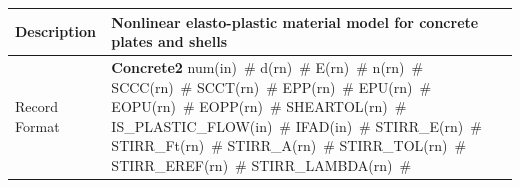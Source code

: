 \documentclass[a4paper]{article}
\newcommand{\descitem}[1]{{\noindent \bf #1}}
\newcommand{\elemparam}[2]{{{#1\tiny (#2)}~\#}}
\newenvironment{mmt}{\begin{tabular}{|l|p{9cm}|}}{\end{tabular}\\}
\newenvironment{mmt}{\begin{tabular}{|l|l|}}{\end{tabular}\\}
\begin{document}
\begin{table}[!htb]
\begin{mmt}
\hline
Description & Nonlinear elasto-plastic material model for concrete
plates and shells\\
\hline
Record Format & \descitem{Concrete2} \elemparam{num}{in}
\elemparam{d}{rn} \elemparam{E}{rn} \elemparam{n}{rn}
\elemparam{SCCC}{rn} \elemparam{SCCT}{rn} \elemparam{EPP}{rn} \elemparam{EPU}{rn}
\elemparam{EOPU}{rn} \elemparam{EOPP}{rn} \elemparam{SHEARTOL}{rn}
\elemparam{IS\_PLASTIC\_FLOW}{in} \elemparam{IFAD}{in} \elemparam{STIRR\_E}{rn} \elemparam{STIRR\_Ft}{rn}
\elemparam{STIRR\_A}{rn} \elemparam{STIRR\_TOL}{rn} \elemparam{STIRR\_EREF}{rn}
\elemparam{STIRR\_LAMBDA}{rn}\\


\end{mmt}
\end{table}
\end{document}
